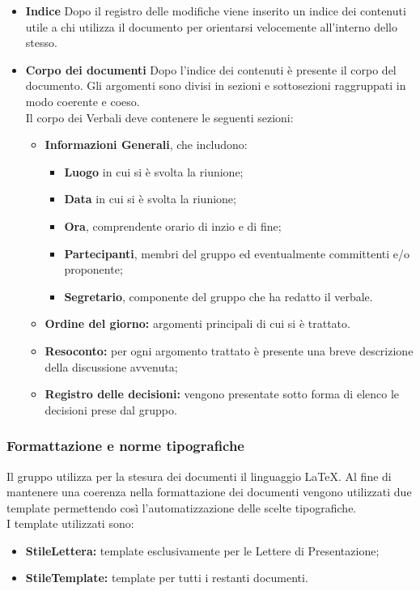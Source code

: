 \begin{itemize}
\item\textbf{Indice}
Dopo il registro delle modifiche viene inserito un indice dei contenuti utile a chi utilizza il documento per orientarsi velocemente all'interno dello stesso.

\item\textbf{Corpo dei documenti}
Dopo l'indice dei contenuti è presente il corpo del documento. Gli argomenti sono divisi in sezioni e sottosezioni raggruppati in modo coerente e coeso. \\
Il corpo dei Verbali deve contenere le seguenti sezioni:
\begin{itemize}
	\item \textbf{Informazioni Generali}, che includono:
		\begin{itemize}
			\item \textbf{Luogo} in cui si è svolta la riunione;
			\item \textbf{Data} in cui si è svolta la riunione;
			\item \textbf{Ora}, comprendente orario di inzio e di fine;
			\item \textbf{Partecipanti}, membri del gruppo ed eventualmente committenti e/o proponente;
			\item \textbf{Segretario}, componente del gruppo che ha redatto il verbale.
		\end{itemize}
	\item \textbf{Ordine del giorno: }argomenti principali di cui si è trattato.
	\item \textbf{Resoconto: }per ogni argomento trattato è presente una breve descrizione della discussione avvenuta;
	\item \textbf{Registro delle decisioni:} vengono presentate sotto forma di elenco le decisioni prese dal gruppo.
\end{itemize}
\end{itemize}

\subsubsection{Formattazione e norme tipografiche}
Il gruppo utilizza per la stesura dei documenti il linguaggio \LaTeX. Al fine di mantenere una coerenza nella formattazione dei documenti vengono utilizzati due template permettendo così l'automatizzazione delle scelte tipografiche. \\
I template utilizzati sono:
\begin{itemize}
	\item \textbf{StileLettera: }template esclusivamente per le Lettere di Presentazione;
	\item \textbf{StileTemplate: }template per tutti i restanti documenti.
\end{itemize}

